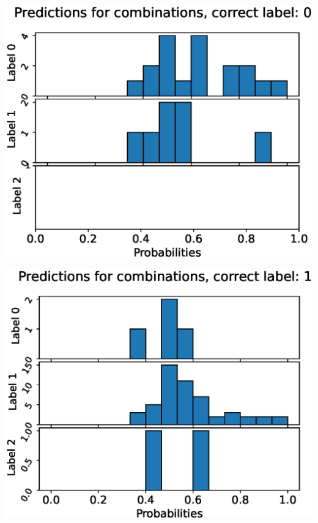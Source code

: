 \begin{center}
\begin{minipage}{0.33\textwidth}
  \includegraphics[width=\textwidth]{files/figs/app/hists/trunk/pc0.eps}
\end{minipage}%
\begin{minipage}{0.33\textwidth}
  \includegraphics[width=\textwidth]{files/figs/app/hists/trunk/pc1.eps}
\end{minipage}%
\begin{minipage}{0.33\textwidth}

\end{minipage}
\end{center}
